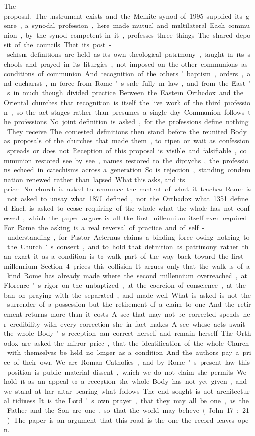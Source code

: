\unit{The proposal.}
The instrument exists and the Melkite synod of 1995 supplied its genre, a synodal profession, here made mutual and multilateral. Each communion, by the synod competent in it, professes three things. The shared deposit of the councils. That its post-schism definitions are held as its own theological patrimony, taught in its schools and prayed in its liturgies, not imposed on the other communions as conditions of communion. And recognition of the others' baptism, orders, and eucharist, in force from Rome's side fully in law, and from the East's in much though divided practice. Between the Eastern Orthodox and the Oriental churches that recognition is itself the live work of the third profession, so the act stages rather than presumes a single day. Communion follows the professions. No joint definition is asked, for the professions define nothing. They receive. The contested definitions then stand before the reunited Body as proposals of the churches that made them, to ripen or wait as confession spreads or does not. Reception of this proposal is visible and falsifiable, communion restored see by see, names restored to the diptychs, the professions echoed in catechisms across a generation. So is rejection, standing condemnation renewed rather than lapsed.

\unit{What this asks, and its price.}
No church is asked to renounce the content of what it teaches. Rome is not asked to unsay what 1870 defined, nor the Orthodox what 1351 defined. Each is asked to cease requiring of the whole what the whole has not confessed, which the paper argues is all the first millennium itself ever required. For Rome the asking is a real reversal of practice and of self-understanding, for Pastor Aeternus claims a binding force owing nothing to the Church's consent, and to hold that definition as patrimony rather than exact it as a condition is to walk part of the way back toward the first millennium. Section 4 prices this collision. It argues only that the walk is of a kind Rome has already made where the second millennium overreached, at Florence's rigor on the unbaptized, at the coercion of conscience, at the ban on praying with the separated, and made well. What is asked is not the surrender of a possession but the retirement of a claim to one. And the retirement returns more than it costs. A see that may not be corrected spends her credibility with every correction she in fact makes. A see whose acts await the whole Body's reception can correct herself and remain herself. The Orthodox are asked the mirror price, that the identification of the whole Church with themselves be held no longer as a condition. And the authors pay a price of their own. We are Roman Catholics, and by Rome's present law this position is public material dissent, which we do not claim she permits. We hold it as an appeal to a reception the whole Body has not yet given, and we stand at her altar bearing what follows. The end sought is not architectural tidiness. It is the Lord's own prayer, that they may all be one, as the Father and the Son are one, so that the world may believe (John 17:21). The paper is an argument that this road is the one the record leaves open.

